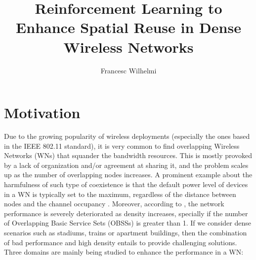 \documentclass[12pt, a4paper,twoside]{tesi_upf}
\title{Reinforcement Learning to Enhance Spatial Reuse in Dense Wireless Networks}
\author{Francesc Wilhelmi}
\begin{document}
	\frontmatter
	
	\maketitle
	
	\cleardoublepage
	
	
	\mainmatter
	
	\tableofcontents
	
	\chapter{Motivation}
	\label{section:introduction}	
		Due to the growing popularity of wireless deployments (especially the ones based in the IEEE 802.11 standard), it is very common to find overlapping Wireless Networks (WNs) that squander the bandwidth resources. This is mostly provoked by a lack of organization and/or agreement at sharing it, and the problem scales up as the number of overlapping nodes increases. A prominent example about the harmfulness of such type of coexistence is that the default power level of devices in a WN is typically set to the maximum, regardless of the distance between nodes and the channel occupancy \cite{akella2007self}. Moreover, according to \cite{zhong2015issues}, the network performance is severely deteriorated as density increases, specially if the number of Overlapping Basic Service Sets (OBSSs) is greater than 1. If we consider dense scenarios such as stadiums, trains or apartment buildings, then the combination of bad performance and high density entails to provide challenging solutions. Three domains are mainly being studied to enhance the performance in a WN:
\end{document}
